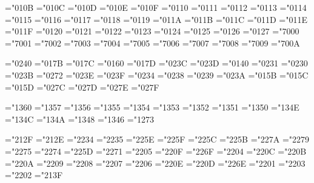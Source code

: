 \mathchardef\alpha="010B
\mathchardef\beta="010C
\mathchardef\gamma="010D
\mathchardef\delta="010E
\mathchardef\epsilon="010F
\mathchardef\zeta="0110
\mathchardef\eta="0111
\mathchardef\theta="0112
\mathchardef\iota="0113
\mathchardef\kappa="0114
\mathchardef\lambda="0115
\mathchardef\mu="0116
\mathchardef\nu="0117
\mathchardef\xi="0118
\mathchardef\pi="0119
\mathchardef\rho="011A
\mathchardef\sigma="011B
\mathchardef\tau="011C
\mathchardef\upsilon="011D
\mathchardef\phi="011E
\mathchardef\chi="011F
\mathchardef\psi="0120
\mathchardef\omega="0121
\mathchardef\varepsilon="0122
\mathchardef\vartheta="0123
\mathchardef\varpi="0124
\mathchardef\varrho="0125
\mathchardef\varsigma="0126
\mathchardef\varphi="0127
\mathchardef\Gamma="7000
\mathchardef\Delta="7001
\mathchardef\Theta="7002
\mathchardef\Lambda="7003
\mathchardef\Xi="7004
\mathchardef\Pi="7005
\mathchardef\Sigma="7006
\mathchardef\Upsilon="7007
\mathchardef\Phi="7008
\mathchardef\Psi="7009
\mathchardef\Omega="700A

\mathchardef\aleph="0240
\def\hbar{{\mathchar'26\mkern-9muh}}
\mathchardef\imath="017B
\mathchardef\jmath="017C
\mathchardef\ell="0160
\mathchardef\wp="017D
\mathchardef\Re="023C
\mathchardef\Im="023D
\mathchardef\partial="0140
\mathchardef\infty="0231
\mathchardef\prime="0230
\mathchardef\emptyset="023B
\mathchardef\nabla="0272
\def\surd{{\mathchar"1270}}
\mathchardef\top="023E
\mathchardef\bot="023F
\def\angle{{\vbox{\ialign{$\m@th\scriptstyle##$\crcr
      \not\mathrel{\mkern14mu}\crcr
      \noalign{\nointerlineskip}
      \mkern2.5mu\leaders\hrule height.34pt\hfill\mkern2.5mu\crcr}}}}
\mathchardef\triangle="0234
\mathchardef\forall="0238
\mathchardef\exists="0239
\mathchardef\neg="023A \let\lnot=\neg
\mathchardef\flat="015B
\mathchardef\natural="015C
\mathchardef\sharp="015D
\mathchardef\clubsuit="027C
\mathchardef\diamondsuit="027D
\mathchardef\heartsuit="027E
\mathchardef\spadesuit="027F

\mathchardef\coprod="1360
\mathchardef\bigvee="1357
\mathchardef\bigwedge="1356
\mathchardef\biguplus="1355
\mathchardef\bigcap="1354
\mathchardef\bigcup="1353
\mathchardef\intop="1352 \def\int{\intop\nolimits}
\mathchardef\prod="1351
\mathchardef\sum="1350
\mathchardef\bigotimes="134E
\mathchardef\bigoplus="134C
\mathchardef\bigodot="134A
\mathchardef\ointop="1348 \def\oint{\ointop\nolimits}
\mathchardef\bigsqcup="1346
\mathchardef\smallint="1273

\mathchardef\triangleleft="212F
\mathchardef\triangleright="212E
\mathchardef\bigtriangleup="2234
\mathchardef\bigtriangledown="2235
\mathchardef\wedge="225E \let\land=\wedge
\mathchardef\vee="225F \let\lor=\vee
\mathchardef\cap="225C
\mathchardef\cup="225B
\mathchardef\ddagger="227A
\mathchardef\dagger="2279
\mathchardef\sqcap="2275
\mathchardef\sqcup="2274
\mathchardef\uplus="225D
\mathchardef\amalg="2271
\mathchardef\diamond="2205
\mathchardef\bullet="220F
\mathchardef\wr="226F
\mathchardef\div="2204
\mathchardef\odot="220C
\mathchardef\oslash="220B
\mathchardef\otimes="220A
\mathchardef\ominus="2209
\mathchardef\oplus="2208
\mathchardef\mp="2207
\mathchardef\pm="2206
\mathchardef\circ="220E
\mathchardef\bigcirc="220D
\mathchardef\setminus="226E %
\mathchardef\cdot="2201
\mathchardef\ast="2203
\mathchardef\times="2202
\mathchardef\star="213F

